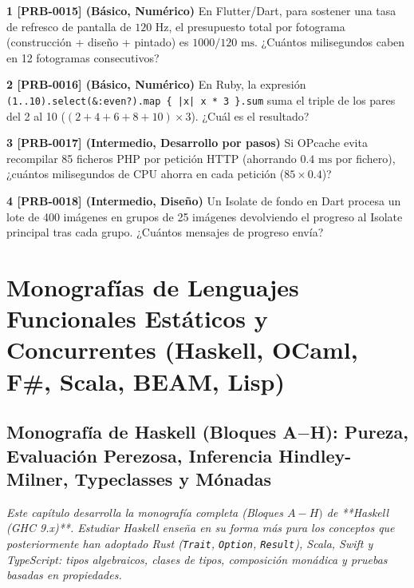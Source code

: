\documentclass{book}
\begin{document}
\begin{tcolorbox}[title={Ejercicios}, studiumworked, breakable]

\noindent\textbf{1 [PRB-0015] (Básico, Numérico)}
En Flutter/Dart, para sostener una tasa de refresco de pantalla de \(120\text{ Hz}\), el presupuesto total por fotograma (construcción + diseño + pintado) es \(1000 / 120\text{ ms}\). ¿Cuántos milisegundos caben en 12 fotogramas consecutivos?

\noindent\textbf{2 [PRB-0016] (Básico, Numérico)}
En Ruby, la expresión \texttt{(1..10).select(\&:even?).map \{ |x| x * 3 \}.sum} suma el triple de los pares del 2 al 10 (\((2+4+6+8+10) \times 3\)). ¿Cuál es el resultado?

\noindent\textbf{3 [PRB-0017] (Intermedio, Desarrollo por pasos)}
Si OPcache evita recompilar 85 ficheros PHP por petición HTTP (ahorrando \(0.4\text{ ms}\) por fichero), ¿cuántos milisegundos de CPU ahorra en cada petición (\(85 \times 0.4\))?

\noindent\textbf{4 [PRB-0018] (Intermedio, Diseño)}
Un Isolate de fondo en Dart procesa un lote de 400 imágenes en grupos de 25 imágenes devolviendo el progreso al Isolate principal tras cada grupo. ¿Cuántos mensajes de progreso envía?
\end{tcolorbox}

\part{Monografías de Lenguajes Funcionales Estáticos y Concurrentes (Haskell, OCaml, F\#, Scala, BEAM, Lisp)}

\chapter{Monografía de Haskell (Bloques A\(-\)H): Pureza, Evaluación Perezosa, Inferencia Hindley-Milner, Typeclasses y Mónadas}
\label{chap:cap04-monografia-haskell-funcional-puro-tipos-monadas}

\noindent\textit{Este capítulo desarrolla la monografía completa (Bloques \(A-H)\) de **Haskell (GHC 9.x)**. Estudiar Haskell enseña en su forma más pura los conceptos que posteriormente han adoptado Rust (\texttt{Trait}, \texttt{Option}, \texttt{Result}), Scala, Swift y TypeScript: tipos algebraicos, clases de tipos, composición monádica y pruebas basadas en propiedades.}
\end{document}
